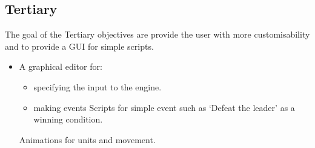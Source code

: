 \subsection{Tertiary} 
\label{tertiary}
The goal of the Tertiary objectives are provide the user with more customisability and to provide a GUI for simple scripts. 

\begin{itemize}
	\cross Custom events
	\begin{itemize}
		\item Attached to units or titles, could be used for:
		\begin{itemize}
			\item Making the player win if some enemies unit has less then 50\% Hit Points.
			
			\item Damaging a character if step on a specified.
			
			\item Showing some part of the story when a player's character reach a specified tile.
		\end{itemize}
	\end{itemize}
	
	\item A graphical editor for:
	\begin{itemize}
		\tick  making custom maps,
		\tick  making animations.
		\item  specifying the input to the engine.
		\item  making events
		\cross  Scripts for simple event such as `Defeat the leader' as a winning condition.
	\end{itemize}
	
	\tick Animations for units and movement.
\end{itemize}